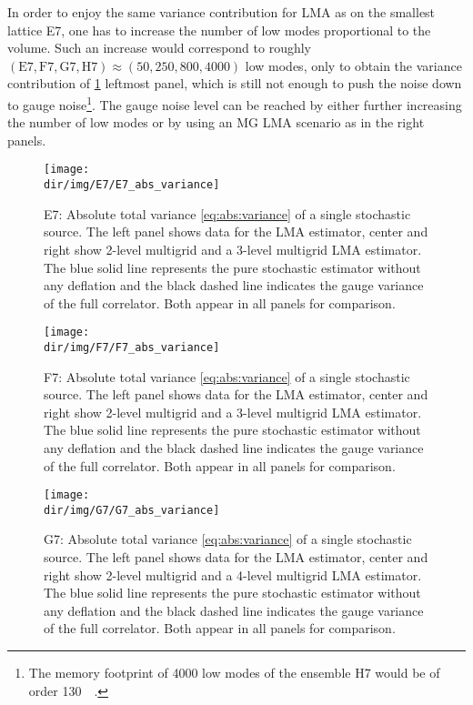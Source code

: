 In order to enjoy the same variance contribution for LMA as on the smallest lattice E7, one has to increase the number of low modes proportional to the volume.
Such an increase would correspond to roughly $(\text{E7}, \text{F7}, \text{G7}, \text{H7}) \approx (50, 250, 800, 4000)$ low modes, only to obtain the variance contribution of \cref{fig:E7:abs:variance} leftmost panel, which is still not enough to push the  noise down to gauge noise\footnote{The memory footprint of \num{4000} low modes of the ensemble H7 would be of order \SI{130}{\tera\byte}.}.
The gauge noise level can be reached by either further increasing the number of low modes or by using an MG LMA scenario as in the right panels.


\begin{figure}
\centering
\texttt{[image: \\dir/img/E7/E7\_abs\_variance]}
\caption{
E7: Absolute total variance \cref{eq:abs:variance} of a single stochastic source.
The left panel shows data for the LMA estimator, center and right show 2-level multigrid and a 3-level multigrid LMA estimator.
The blue solid line represents the pure stochastic estimator without any deflation and the black dashed line indicates the gauge variance of the full correlator. Both appear in all panels for comparison.
\takenpart
}
\label{fig:E7:abs:variance}
\end{figure}

\begin{figure}
\centering
\texttt{[image: \\dir/img/F7/F7\_abs\_variance]}
\caption{
F7: Absolute total variance \cref{eq:abs:variance} of a single stochastic source.
The left panel shows data for the LMA estimator, center and right show 2-level multigrid and a 3-level multigrid LMA estimator.
The blue solid line represents the pure stochastic estimator without any deflation and the black dashed line indicates the gauge variance of the full correlator. Both appear in all panels for comparison.
\takenpart
}
\label{fig:F7:abs:variance}
\end{figure}

\begin{figure}
\centering
\texttt{[image: \\dir/img/G7/G7\_abs\_variance]}
\caption{
G7: Absolute total variance \cref{eq:abs:variance} of a single stochastic source.
The left panel shows data for the LMA estimator, center and right show 2-level multigrid and a 4-level multigrid LMA estimator.
The blue solid line represents the pure stochastic estimator without any deflation and the black dashed line indicates the gauge variance of the full correlator. Both appear in all panels for comparison.
\takenpart
}
\label{fig:G7:abs:variance}
\end{figure}

